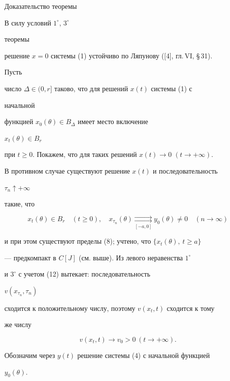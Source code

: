 \begin{pf*}{Доказательство теоремы}


В силу условий $1^{\circ}$, $3^{\circ}$


теоремы


решение $x=0$ системы (1) устойчиво по Ляпунову ([4], гл.\,VI, \S\,31).


Пусть


число $\Delta\in (0,r]$ таково, что для решений $x(t)$ системы (1) с


начальной


функцией $x_0(\theta)\in B_{\Delta}$ имеет место включение


$x_t(\theta)\in B_r$


при $t\geqslant 0$. Покажем, что для таких решений $x(t)\to 0$ $(t\to


+\infty)$.


В противном случае существуют решение $x(t)$ и последовательность


$\tau_n\uparrow +\infty$


такие, что


\begin{equation}


x_t(\theta)\in B_r\quad (t\geqslant 0),\quad


x_{\tau_n}(\theta)\underset{[-a,0]}{\rightrightarrows}{}


y_0(\theta)\ne 0\quad (n\to\infty)


\end{equation}


и при этом существуют пределы (8); учтено, что $\{x_t(\theta),\


t\geqslant a\}$


--- предкомпакт в $C[J]$ (см. выше). Из левого неравенства $1^{\circ}$


и $3^{\circ}$ с учетом (12) вытекает: последовательность


$v(x_{\tau_n},\tau_n)$


сходится к положительному числу, поэтому $v(x_t,t)$ сходится к тому


же числу


\begin{equation}


v(x_t,t)\to v_0>0\ (t\to +\infty).


\end{equation}


Обозначим через $y(t)$ решение системы (4) с начальной функцией


$y_0(\theta)$.



\end{pf*}
